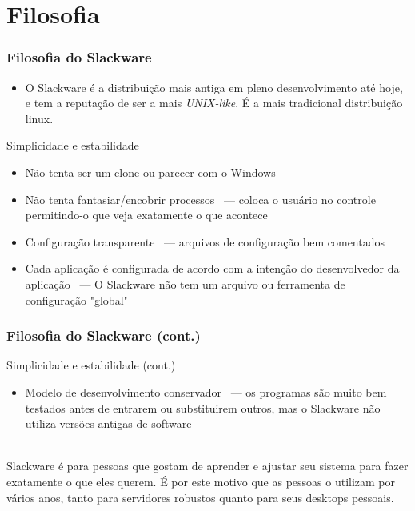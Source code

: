 \documentclass[aspectratio=169]{beamer}
\begin{document}
\section{Filosofia}
\begin{frame}
	\frametitle{Filosofia do Slackware}
		\begin{itemize}
			\item O Slackware é a distribuição mais antiga em pleno
				desenvolvimento até hoje, e tem a reputação de ser a mais
				\textit{UNIX-like}. É a mais tradicional distribuição
				linux.
		\end{itemize}
		\begin{block}{Simplicidade e estabilidade}
			\begin{itemize}
				\item Não tenta ser um clone ou parecer com o Windows
				\item Não tenta fantasiar/encobrir processos ~--- coloca o usuário
					no controle permitindo-o que veja exatamente o que acontece
				\item Configuração transparente ~--- arquivos de configuração bem
					comentados
				\item Cada aplicação é configurada de acordo com a intenção do
					desenvolvedor da aplicação ~--- O Slackware não tem um arquivo
					ou ferramenta de configuração "global"
			\end{itemize}
		\end{block}
\end{frame}
\begin{frame}
	\frametitle{Filosofia do Slackware (cont.)}
		\begin{block}{Simplicidade e estabilidade (cont.)}
			\begin{itemize}
				\item Modelo de desenvolvimento conservador ~--- os programas são
					muito bem testados antes de entrarem ou substituirem outros,
					mas o Slackware não utiliza versões antigas de software
			\end{itemize}
		\end{block}
		~\\
		Slackware é para pessoas que gostam de aprender e ajustar seu sistema
		para fazer exatamente o que eles querem. É por este motivo que as
		pessoas o utilizam por vários anos, tanto para servidores robustos
		quanto para seus desktops pessoais.
\end{frame}
\end{document}
